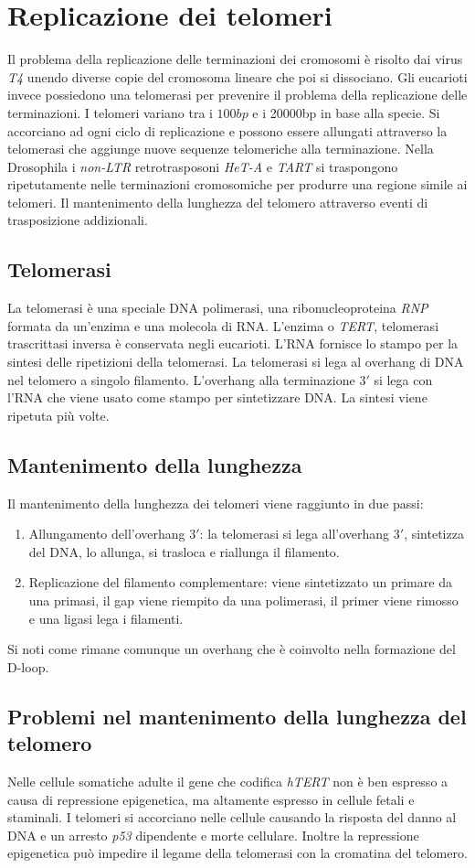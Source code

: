 \section{Replicazione dei telomeri}
Il problema della replicazione delle terminazioni dei cromosomi \`e risolto dai virus \emph{T4} unendo diverse copie del cromosoma lineare che poi si dissociano. Gli eucarioti invece
possiedono una telomerasi per prevenire il problema della replicazione delle terminazioni. I telomeri variano tra i $100bp$ e i \num{20000}\si{bp} in base alla specie. Si 
accorciano ad ogni ciclo di replicazione e possono essere allungati attraverso la telomerasi che aggiunge nuove sequenze telomeriche alla terminazione. Nella Drosophila i \emph{non-LTR}
retrotrasposoni \emph{HeT-A} e \emph{TART} si traspongono ripetutamente nelle terminazioni cromosomiche per produrre una regione simile ai telomeri. Il mantenimento della 
lunghezza del telomero attraverso eventi di trasposizione addizionali. 
\subsection{Telomerasi}
La telomerasi \`e una speciale DNA polimerasi, una ribonucleoproteina \emph{RNP} formata da un'enzima e una molecola di RNA. L'enzima o \emph{TERT}, telomerasi trascrittasi inversa
\`e conservata negli eucarioti. L'RNA fornisce lo stampo per la sintesi delle ripetizioni della telomerasi. La telomerasi si lega al overhang di DNA nel telomero a singolo filamento. 
L'overhang alla terminazione $3'$ si lega con l'RNA che viene usato come stampo per sintetizzare DNA. La sintesi viene ripetuta pi\`u volte. 
\subsection{Mantenimento della lunghezza}
Il mantenimento della lunghezza dei telomeri viene raggiunto in due passi:
\begin{enumerate}
	\item Allungamento dell'overhang $3'$: la telomerasi si lega all'overhang $3'$, sintetizza del DNA, lo allunga, si trasloca e riallunga il filamento.
	\item Replicazione del filamento complementare: viene sintetizzato un primare da una primasi, il gap viene riempito da una polimerasi, il primer viene rimosso e una ligasi 
		lega i filamenti.
\end{enumerate}
Si noti come rimane comunque un overhang che \`e coinvolto nella formazione del D-loop. 
\subsection{Problemi nel mantenimento della lunghezza del telomero}
Nelle cellule somatiche adulte il gene che codifica \emph{hTERT} non \`e ben espresso a causa di repressione epigenetica, ma altamente espresso in cellule fetali e staminali. I telomeri
si accorciano nelle cellule causando la risposta del danno al DNA e un arresto \emph{p53} dipendente e morte cellulare. Inoltre la repressione epigenetica pu\`o impedire il 
legame della telomerasi con la cromatina del telomero.

